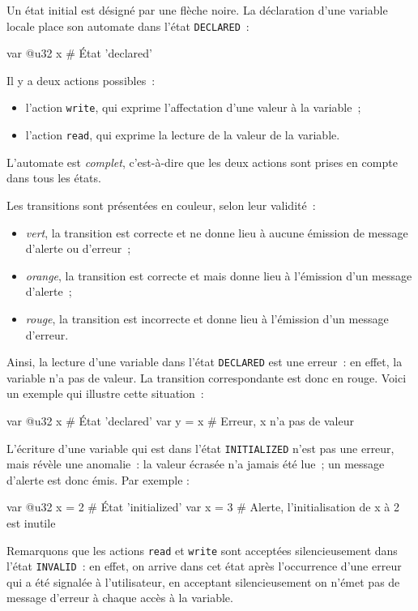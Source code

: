 Un état initial est désigné par une flèche noire. La déclaration d'une variable locale place son automate dans l'état \texttt{DECLARED}~:

\begin{galgas4}
var @u32 x # État 'declared'
\end{galgas4}

Il y a deux actions possibles~:
\begin{itemize}
  \item l'action \texttt{write}, qui exprime l'affectation d'une valeur à la variable~;
  \item l'action \texttt{read}, qui exprime la lecture de la valeur de la variable.
\end{itemize}

L'automate est \emph{complet}, c'est-à-dire que les deux actions sont prises en compte dans tous les états.

Les transitions sont présentées en couleur, selon leur validité~:
\begin{itemize}
  \item \emph{vert}, la transition est correcte et ne donne lieu à aucune émission de message d'alerte ou d'erreur~;
  \item \emph{orange}, la transition est correcte et mais donne lieu à l'émission d'un message d'alerte~;
  \item \emph{rouge}, la transition est incorrecte et donne lieu à l'émission d'un message d'erreur.
\end{itemize}

Ainsi, la lecture d'une variable dans l'état \texttt{DECLARED} est une erreur~: en effet, la variable n'a pas de valeur. La transition correspondante est donc en rouge. Voici un exemple qui illustre cette situation~:
\begin{galgas4}
var @u32 x # État 'declared'
var y = x # Erreur, x n'a pas de valeur
\end{galgas4}

L'écriture d'une variable qui est dans l'état \texttt{INITIALIZED} n'est pas une erreur, mais révèle une anomalie~: la valeur écrasée n'a jamais été lue~; un message d'alerte est donc émis. Par exemple :
\begin{galgas4}
var @u32 x = 2 # État 'initialized'
var x = 3 # Alerte, l'initialisation de x à 2 est inutile
\end{galgas4}

Remarquons que les actions \texttt{read} et \texttt{write} sont acceptées silencieusement dans l'état \texttt{INVALID}~: en effet, on arrive dans cet état après l'occurrence d'une erreur qui a été signalée à l'utilisateur, en acceptant silencieusement on n'émet pas de message d'erreur à chaque accès à la variable.

